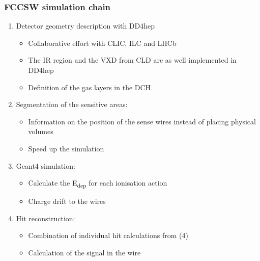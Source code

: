 \documentclass[hyperref={colorlinks=true,pdfpagelabels=false,linkcolor=black}, xcolor=dvipsnames,10pt]{beamer}
\begin{document}
\begin{frame}
	\frametitle{FCCSW simulation chain}
	
	\begin{enumerate}
	\item Detector geometry description with DD4hep
		\begin{itemize}
		\item Collaborative effort with CLIC, ILC and LHCb
		\item The IR region and the VXD from CLD are as well implemented in DD4hep
		\item Definition of the gas layers in the DCH 
		\end{itemize}
	\item Segmentation of the sensitive areas:
		\begin{itemize}
		\item Information on the position of the sense wires instead of placing physical volumes
		\item Speed up the simulation
		\end{itemize}
	\item Geant4 simulation:
		\begin{itemize}
		\item Calculate the E\textsubscript{dep} for each ionisation action
		\item Charge drift to the wires
		\end{itemize}
	\item Hit reconstruction:
		\begin{itemize}
		\item Combination of individual hit calculations from (4)
		\item Calculation of the signal in the wire
		\end{itemize}
	\end{enumerate}		
	
  	

\end{frame}
\end{document}
